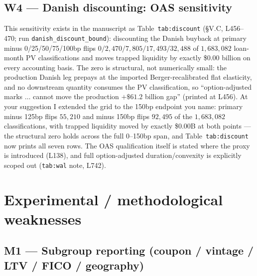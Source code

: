 \documentclass[11pt]{article}
\newcommand{\mlabel}[1]{\texttt{#1}}
\newcommand{\run}[1]{\texttt{#1}}
\begin{document}
\subsection*{W4 --- Danish discounting: OAS sensitivity}

This sensitivity exists in the manuscript as Table~\mlabel{tab:discount}
(\S V.C, L456--470; run \run{danish\_discount\_bound}): discounting the Danish
buyback at primary minus 0/25/50/75/100bp flips $0/2{,}470/7{,}805/17{,}493/
32{,}488$ of $1{,}683{,}082$ loan-month PV classifications and moves trapped
liquidity by exactly \$0.00 billion on every accounting basis. The zero is
structural, not numerically small: the production Danish leg prepays at the
imported Berger-recalibrated flat elasticity, and no downstream quantity
consumes the PV classification, so ``option-adjusted marks $\ldots$ cannot
move the production $+\$61.2$ billion gap'' (printed at L456). At your
suggestion I extended the grid to the 150bp endpoint you name: primary minus
125bp flips $55{,}210$ and minus 150bp flips $92{,}495$ of the $1{,}683{,}082$
classifications, with trapped liquidity moved by exactly \$0.00B at both
points --- the structural zero holds across the full 0--150bp span, and
Table~\mlabel{tab:discount} now prints all seven rows. The OAS qualification
itself is stated where the proxy is introduced (L138), and full
option-adjusted duration/convexity is explicitly scoped out
(\mlabel{tab:wal} note, L742).

\section*{Experimental / methodological weaknesses}

\subsection*{M1 --- Subgroup reporting (coupon / vintage / LTV / FICO / geography)}
\end{document}
